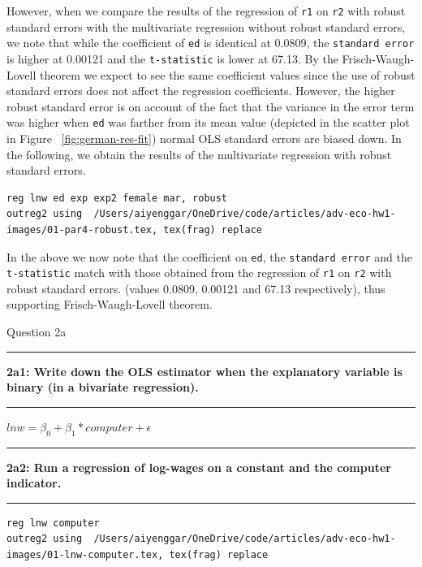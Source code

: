 \documentclass[12pt]{article}
\newcommand\question[2]{\vspace{1em}\hrule\vspace{1em}\textbf{#1: #2}\vspace{1em}\hrule\vspace{1em}}
\begin{document}
However, when we compare the results of the regression of \verb|r1| on \verb|r2| with robust standard errors with the multivariate regression without robust standard errors, we note that while the coefficient of \verb|ed| is identical at 0.0809, the \verb|standard error| is higher at 0.00121 and the \verb|t-statistic| is lower at 67.13. By the Frisch-Waugh-Lovell theorem we expect to see the same coefficient values since the use of robust standard errors does not affect the regression coefficients. However, the higher robust standard error is on account of the fact that the variance in the error term was higher when \verb|ed| was farther from its mean value (depicted in the scatter plot in Figure ~\ref{fig:german-res-fit}) normal OLS standard errors are biased down. In the following, we obtain the results of the multivariate regression with robust standard errors.
\begin{lstlisting}
reg lnw ed exp exp2 female mar, robust
outreg2 using  /Users/aiyenggar/OneDrive/code/articles/adv-eco-hw1-images/01-par4-robust.tex, tex(frag) replace
\end{lstlisting}


In the above we now note that the coefficient on \verb|ed|, the \verb|standard error| and the \verb|t-statistic| match with those obtained from the regression of \verb|r1| on \verb|r2| with robust standard errors. (values 0.0809, 0.00121 and 67.13 respectively), thus supporting Frisch-Waugh-Lovell theorem.
\newpage
\begin{center}\LARGE{Question 2a}\end{center}

\question{2a1}{Write down the OLS estimator when the explanatory variable is binary (in a bivariate regression).  }
$lnw = \beta_0 + \beta_1 * computer + \epsilon$

\question{2a2}{Run a regression of log-wages on a constant and the computer indicator.  }
\begin{lstlisting}
reg lnw computer
outreg2 using  /Users/aiyenggar/OneDrive/code/articles/adv-eco-hw1-images/01-lnw-computer.tex, tex(frag) replace
\end{lstlisting}

\end{document}
